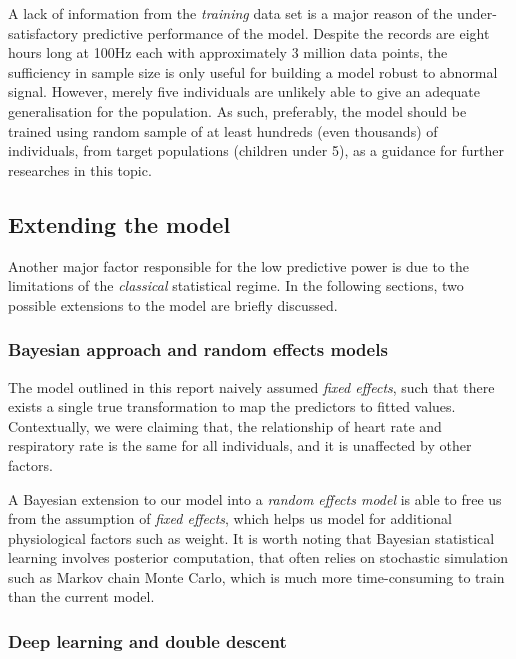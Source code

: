 \documentclass[
]{article}
\begin{document}
A lack of information from the \emph{training} data set is a major
reason of the under-satisfactory predictive performance of the model.
Despite the records are eight hours long at 100Hz each with
approximately 3 million data points, the sufficiency in sample size is
only useful for building a model robust to abnormal signal. However,
merely five individuals are unlikely able to give an adequate
generalisation for the population. As such, preferably, the model should
be trained using random sample of at least hundreds (even thousands) of
individuals, from target populations (children under 5), as a guidance
for further researches in this topic.

\hypertarget{extending-the-model}{%
\subsection{Extending the model}\label{extending-the-model}}

Another major factor responsible for the low predictive power is due to
the limitations of the \emph{classical} statistical regime. In the
following sections, two possible extensions to the model are briefly
discussed.

\hypertarget{bayesian-approach-and-random-effects-models}{%
\subsubsection{Bayesian approach and random effects
models}\label{bayesian-approach-and-random-effects-models}}

The model outlined in this report naively assumed \emph{fixed effects},
such that there exists a single true transformation to map the
predictors to fitted values. Contextually, we were claiming that, the
relationship of heart rate and respiratory rate is the same for all
individuals, and it is unaffected by other factors.

A Bayesian extension to our model into a \emph{random effects model} is
able to free us from the assumption of \emph{fixed effects}, which helps
us model for additional physiological factors such as weight. It is
worth noting that Bayesian statistical learning involves posterior
computation, that often relies on stochastic simulation such as Markov
chain Monte Carlo, which is much more time-consuming to train than the
current model.

\hypertarget{deep-learning-and-double-descent}{%
\subsubsection{Deep learning and double
descent}\label{deep-learning-and-double-descent}}
\end{document}
